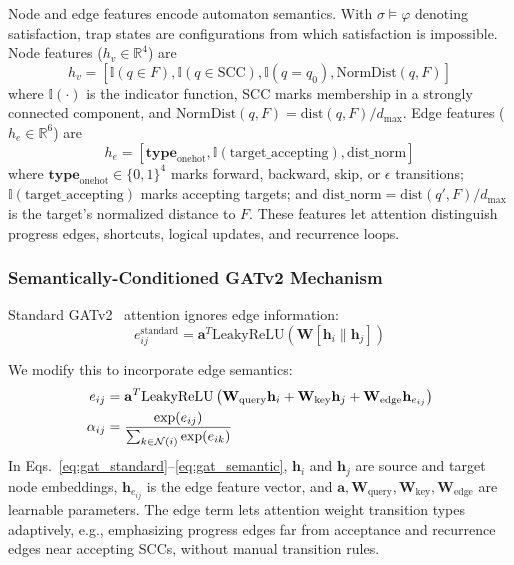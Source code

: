 \documentclass[conference]{IEEEtran}
\begin{document}
Node and edge features encode automaton semantics. With $\sigma\models\varphi$ denoting satisfaction, trap states are configurations from which satisfaction is impossible. Node features ($h_v\in\mathbb{R}^4$) are
\begin{equation}
\label{eq:node_features}
h_v = [\mathbb{I}(q \in F), \mathbb{I}(q \in \text{SCC}), \mathbb{I}(q = q_0), \text{NormDist}(q, F)]
\end{equation}
where $\mathbb{I}(\cdot)$ is the indicator function, SCC marks membership in a strongly connected component, and $\text{NormDist}(q,F)=\text{dist}(q,F)/d_{\max}$. Edge features ($h_e\in\mathbb{R}^6$) are
\begin{equation}
\label{eq:edge_features}
h_e = [\mathbf{type}_{\text{onehot}}, \mathbb{I}(\text{target\_accepting}), \text{dist\_norm}]
\end{equation}
where $\mathbf{type}_{\text{onehot}}\in\{0,1\}^4$ marks forward, backward, skip, or $\epsilon$ transitions; $\mathbb{I}(\text{target\_accepting})$ marks accepting targets; and $\text{dist\_norm}=\text{dist}(q',F)/d_{\max}$ is the target's normalized distance to $F$. These features let attention distinguish progress edges, shortcuts, logical updates, and recurrence loops.

\subsubsection{Semantically-Conditioned GATv2 Mechanism}

Standard GATv2~\citep{Brody2022} attention ignores edge information:
\begin{equation}
\label{eq:gat_standard}
e_{ij}^{\text{standard}} = \mathbf{a}^T \text{LeakyReLU}(\mathbf{W} [\mathbf{h}_i \| \mathbf{h}_j])
\end{equation}

We modify this to incorporate edge semantics:
\begin{align}
\label{eq:gat_semantic}
e_{ij} &= \mathbf{a}^T \text{LeakyReLU}\left( \mathbf{W}_{\text{query}} \mathbf{h}_i + \mathbf{W}_{\text{key}} \mathbf{h}_j + \mathbf{W}_{\text{edge}} \mathbf{h}_{e_{ij}} \right) \notag \\
\alpha_{ij} &= \frac{\exp(e_{ij})}{\sum_{k \in \mathcal{N}(i)} \exp(e_{ik})}
\end{align}
In Eqs.~\ref{eq:gat_standard}--\ref{eq:gat_semantic}, $\mathbf{h}_i$ and $\mathbf{h}_j$ are source and target node embeddings, $\mathbf{h}_{e_{ij}}$ is the edge feature vector, and $\mathbf{a},\mathbf{W}_{\text{query}},\mathbf{W}_{\text{key}},\mathbf{W}_{\text{edge}}$ are learnable parameters. The edge term lets attention weight transition types adaptively, e.g., emphasizing progress edges far from acceptance and recurrence edges near accepting SCCs, without manual transition rules.
\end{document}
